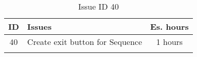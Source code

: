 \begin{longtable} { | c | p{12cm} | c | } 
\hline
	ID 	&	Issues	&		 Es. hours \\\hline
	40	&	Create exit button for Sequence	&	1 hours \\\hline
\caption{Issue ID 40}
\label{tab:spr3_createexitbutton}
\end{longtable}
